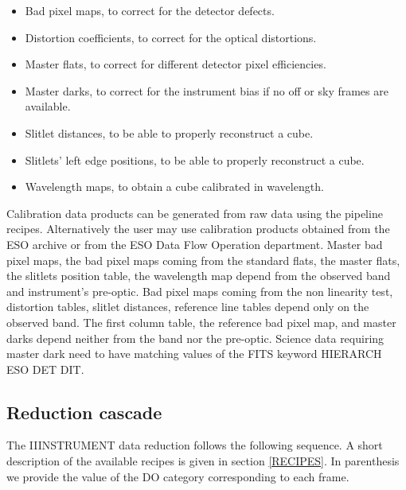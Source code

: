 \begin{itemize}
\begin{itemize}
\item Bad pixel maps, to correct for the detector defects.
\item Distortion coefficients, to correct for the optical distortions.
\item Master flats, to correct for different detector pixel efficiencies.
\item Master darks, to correct for the instrument bias if no off or sky 
frames are available.
\item Slitlet distances, to be able to properly reconstruct a cube.
\item Slitlets' left edge positions, to be able to properly reconstruct a cube.
\item Wavelength maps, to obtain a cube calibrated in wavelength.
\end{itemize}
\end{itemize}
Calibration data products can be generated from raw data using the pipeline 
recipes. Alternatively the user may use calibration products obtained from 
the ESO archive or from the ESO Data Flow Operation department.
Master bad pixel maps, the bad pixel maps coming from the standard flats, 
the master flats, the slitlets position table, the wavelength map depend 
from the observed band and instrument's pre-optic. Bad pixel maps coming 
from the non linearity test, distortion tables, slitlet distances, reference 
line tables depend only on the observed band. The first column table, the 
reference bad pixel map, and master darks depend neither from the 
band nor the pre-optic. Science data requiring master dark need to have 
matching values of the FITS keyword HIERARCH ESO DET DIT.



\subsection{Reduction cascade} 


The IIINSTRUMENT data reduction follows the following sequence. A short 
description of the available recipes is given in section \ref{RECIPES}.
In parenthesis we provide the value of the DO category corresponding to each 
frame.


